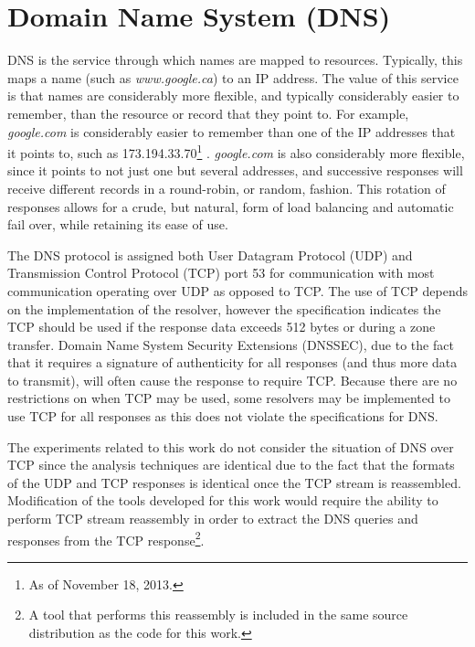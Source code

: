 \documentclass[12pt]{report}
\theoremstyle{remark}
\theoremstyle{definition}
\theoremstyle{definition}
\theoremstyle{definition}
\begin{document}
\section{Domain Name System (DNS)}

DNS is the service through which names are mapped to
resources\cite{rfc1034}\cite{rfc1035}. Typically, this maps a name (such as
\emph{www.google.ca}) to an IP address. The value of this service is that names
are considerably more flexible, and typically considerably easier to remember,
than the resource or record that they point to. For example, \emph{google.com}
is considerably easier to remember than one of the IP addresses that it points
to, such as 173.194.33.70\footnote{As of November 18, 2013.} . \emph{google.com}
is also considerably more flexible, since it points to not just one but several
addresses, and successive responses will receive different records in a
round-robin, or random, fashion. This rotation of responses allows for a crude,
but natural, form of load balancing and automatic fail over, while retaining its
ease of use.

The DNS protocol is assigned both User Datagram Protocol (UDP) and Transmission
Control Protocol (TCP) port 53 for communication with most communication
operating over UDP as opposed to TCP. The use of TCP depends on the
implementation of the resolver, however the specification indicates the TCP
should be used if the response data exceeds 512 bytes or during a zone
transfer\cite{rfc1035}. Domain Name System Security Extensions (DNSSEC), due to
the fact that it requires a signature of authenticity for all responses (and
thus more data to transmit), will often cause the response to require
TCP\cite{rfc4034}. Because there are no restrictions on when TCP may be used,
some resolvers may be implemented to use TCP for all responses as this does not
violate the specifications for DNS.


The experiments related to this work do not consider the situation of DNS over
TCP since the analysis techniques are identical due to the fact that the formats
of the UDP and TCP responses is identical once the TCP stream is reassembled.
Modification of the tools developed for this work would require the ability to
perform TCP stream reassembly in order to extract the DNS queries and responses
from the TCP response\footnote{A tool that performs this reassembly is included
in the same source distribution as the code for this work.}.
\end{document}

